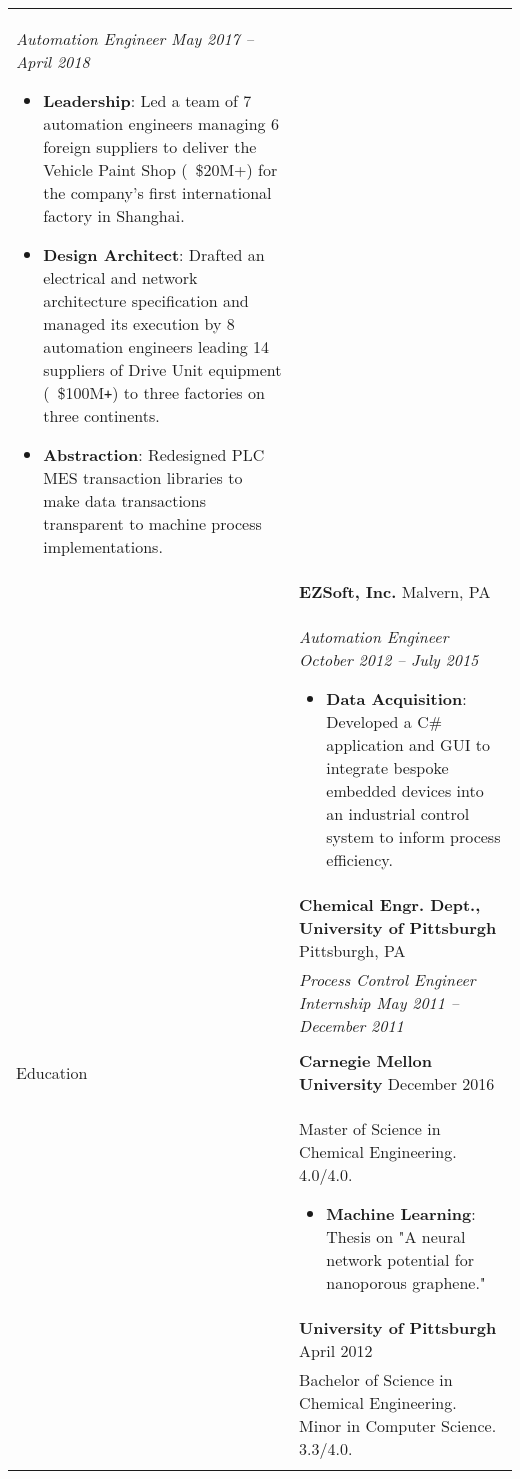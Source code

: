 \documentclass[11pt]{article}
\begin{document}
\begin{tabular}[t]{@{}p{1.05in} @{}p{6.00in}}
    \textit{Automation Engineer \hfill May 2017 -- April 2018}
        \begin{itemize}[noitemsep,topsep=0pt]
            \item \textbf{Leadership}: Led a team of 7 automation engineers managing 6 foreign suppliers to deliver the Vehicle Paint Shop (~\$20M+) for the company's first international factory in Shanghai.%
            \item \textbf{Design Architect}: Drafted an electrical and network architecture specification and managed its execution by 8 automation engineers leading 14 suppliers of Drive Unit equipment (~\$100M\verb!+!) to three factories on three continents.%
            \item \textbf{Abstraction}: Redesigned PLC MES transaction libraries to make data transactions transparent to machine process implementations.%
        \end{itemize}
\\
&
\textbf{EZSoft, Inc.}  \hfill Malvern, PA \\ &
 
    \textit{Automation Engineer \hfill October 2012 -- July 2015}
        \begin{itemize}[noitemsep,topsep=0pt]
            \item \textbf{Data Acquisition}: Developed a C\# application and GUI to integrate bespoke embedded devices into an industrial control system to inform process efficiency.%
        \end{itemize}
\\
&
\textbf{Chemical Engr. Dept., University of Pittsburgh}  \hfill Pittsburgh, PA \\ &
 
    \textit{Process Control Engineer Internship \hfill May 2011 -- December 2011}
\\
\\


{Education}
&
\textbf{Carnegie Mellon University} \hfill December 2016 \\ &
Master of Science in Chemical Engineering. 4.0/4.0. 
\begin{itemize}
    \item \textbf{Machine Learning}: Thesis on "A neural network potential for nanoporous graphene."
\end{itemize}
\\
&
\textbf{University of Pittsburgh} \hfill April 2012 \\ &
Bachelor of Science in Chemical Engineering. Minor in Computer Science. 3.3/4.0. 
\vspace{0.5\baselineskip}
\\
\\

\end{tabular}
\end{document}

